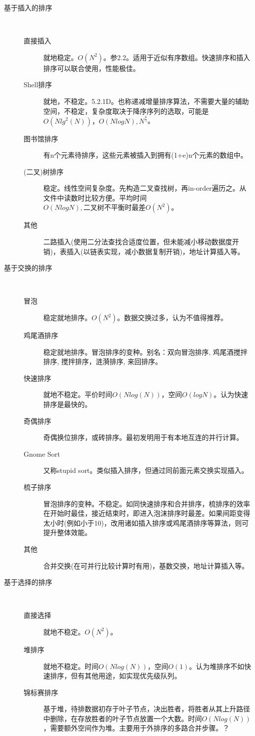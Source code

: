 \begin{description}
    \item[基于插入的排序] 
        \hfill \\
	\begin{description}
	    \item[直接插入]就地稳定。$O(N^2)$。参\cite{ita}2.2。适用于近似有序数组。快速排序和插入排序可以联合使用，性能极佳。
	    \item[Shell排序]就地，不稳定。\cite{acp}5.2.1D。也称递减增量排序算法，不需要大量的辅助空间，不稳定，复杂度取决于降序序列的选取，可能是$O(Nlg^{2}(N))，O(NlogN), N^{\frac{6}{5}}$。
	    \item[图书馆排序]有n个元素待排序，这些元素被插入到拥有(1+e)n个元素的数组中。
	    \item[(二叉)树排序]稳定。线性空间复杂度。先构造二叉查找树，再in-order遍历之。从文件中读数时比较方便。平均时间$O(NlogN),二叉树不平衡时最差O(N^2)$。
	    \item[其他]二路插入(使用二分法查找合适度位置，但未能减小移动数据度开销)，表插入(以链表实现，减小数据复制开销)，地址计算插入等。
	\end{description}
    \item[基于交换的排序] 
        \hfill \\
	\begin{description}
	    \item[冒泡]稳定就地排序。$O(N^2)$。数据交换过多，\cite{acp}认为不值得推荐。
	    \item[鸡尾酒排序]稳定就地排序。冒泡排序的变种。别名：双向冒泡排序, 鸡尾酒搅拌排序, 搅拌排序，涟漪排序, 来回排序。
	    \item[快速排序]就地不稳定。平价时间$O(Nlog(N))$，空间$O(logN)$。\cite{sedgewick}认为快速排序是最快的。
	    \item[奇偶排序]奇偶换位排序，或砖排序。最初发明用于有本地互连的并行计算。
	    \item[Gnome Sort]又称stupid sort。类似插入排序，但通过同前面元素交换实现插入。
	    \item[梳子排序]冒泡排序的变种。不稳定。如同快速排序和合并排序，梳排序的效率在开始时最佳，接近结束时，即进入泡沫排序时最差。如果间距变得太小时(例如小于10)，改用诸如插入排序或鸡尾酒排序等算法，则可提升整体效能。
	    \item[其他]合并交换(在可并行比较计算时有用)，基数交换，地址计算插入等。
	\end{description}
    \item[基于选择的排序]
        \hfill \\
	\begin{description}
	    \item[直接选择]就地不稳定。$O(N^2)$。
	    \item[堆排序]就地不稳定。时间$O(Nlog(N))$，空间$O(1)$。\cite{ita}认为堆排序不如快速排序，但有其他用途，如实现优先级队列。	
	    \item[锦标赛排序]基于堆，待排数据初存于叶子节点，决出胜者，将胜者从其上升路径中删除，在存放胜者的叶子节点放置一个大数。时间$O(Nlog(N))$，需要额外空间作为堆。主要用于外排序的多路合并步骤。？


\end{description}
\end{description}
